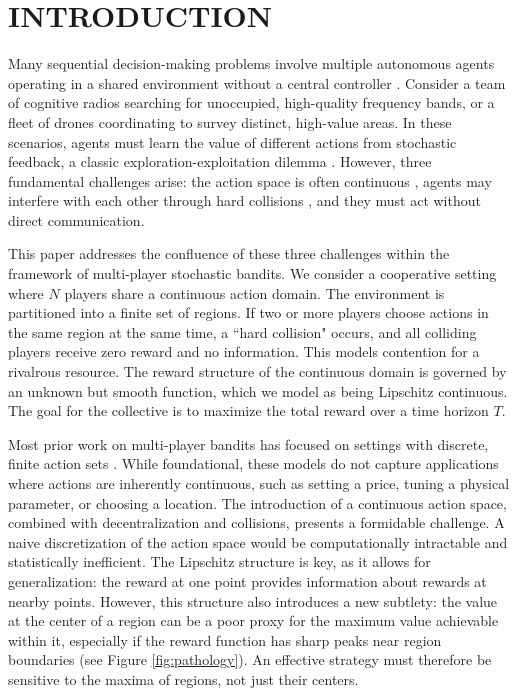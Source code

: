 \section{INTRODUCTION} \label{sec:intro}

Many sequential decision-making problems involve multiple autonomous agents operating in a shared environment without a central controller \citep{boursier2020survey, landgren2020distributed}. Consider a team of cognitive radios \citep{jouini2012decision,liu2010distributed,anandkumar2011distributed} searching for unoccupied, high-quality frequency bands, or a fleet of drones coordinating to survey distinct, high-value areas. In these scenarios, agents must learn the value of different actions from stochastic feedback, a classic exploration-exploitation dilemma \citep{lai1985asymptotically,auer2002finite,slivkins2019introduction,lattimore2020bandit}. However, three fundamental challenges arise: the action space is often continuous \citep{Kleinberg,bubeck2011xarmed,magureanu2014lipschitz}, agents may interfere with each other through hard collisions \citep{rosenski2016multi}, and they must act without direct communication.

This paper addresses the confluence of these three challenges within the framework of multi-player stochastic bandits. We consider a cooperative setting where $N$ players share a continuous action domain. The environment is partitioned into a finite set of regions. If two or more players choose actions in the same region at the same time, a ``hard collision" occurs, and all colliding players receive zero reward and no information. This models contention for a rivalrous resource. The reward structure of the continuous domain is governed by an unknown but smooth function, which we model as being Lipschitz continuous. The goal for the collective is to maximize the total reward over a time horizon $T$.


Most prior work on multi-player bandits has focused on settings with discrete, finite action sets \citep{agarwal2025multiplayer,rosenski2016multi,wang2020optimal}. While foundational, these models do not capture applications where actions are inherently continuous, such as setting a price, tuning a physical parameter, or choosing a location. The introduction of a continuous action space, combined with decentralization and collisions, presents a formidable challenge. A naive discretization of the action space would be computationally intractable and statistically inefficient. The Lipschitz structure \citep{Kleinberg,magureanu2014lipschitz,chakraborty2025incentivized} is key, as it allows for generalization: the reward at one point provides information about rewards at nearby points. However, this structure also introduces a new subtlety: the value at the center of a region can be a poor proxy for the maximum value achievable within it, especially if the reward function has sharp peaks near region boundaries (see Figure \ref{fig:pathology}). An effective strategy must therefore be sensitive to the maxima of regions, not just their centers.

